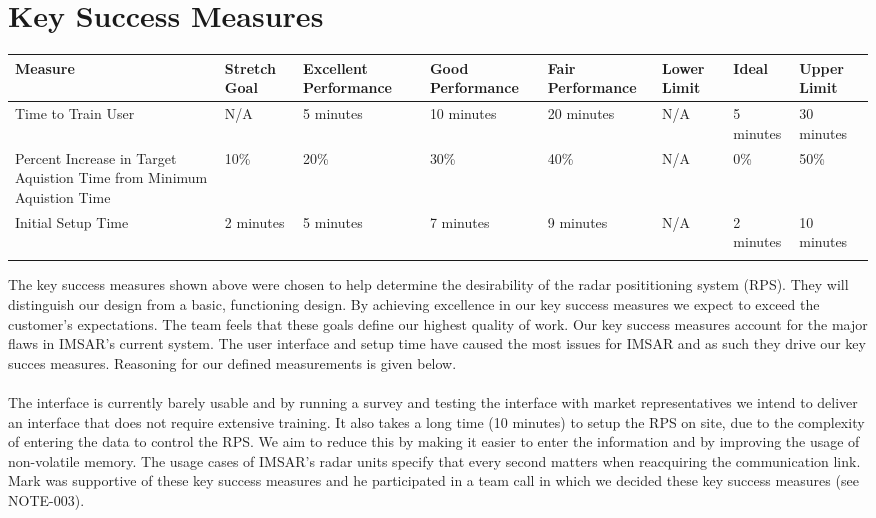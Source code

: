 
\chapter{Key Success Measures}
{
    \centering
   \resizebox{\textwidth}{!}
    {
    \begin{tabular}{>{\raggedright}p{3cm} >{\raggedright}p{2cm} >{\raggedright}p{2.3cm} >{\raggedright}p{2.3cm} >{\raggedright}p{2.2cm} >{\raggedright}p{1.2cm}  p{1.5cm} p{1.7cm}}
    
    \hline
   \textbf{Measure} & \textbf{Stretch Goal} & \textbf{Excellent Performance} & \textbf{Good Performance} & \textbf{Fair Performance} & \textbf{Lower Limit} & \textbf{Ideal} & \textbf{Upper Limit} \\
    \hline
    \hline
    
    
    
    Time to Train User &
    N/A &
    5 minutes &
    10 minutes &
    20 minutes &
    N/A &
    5 minutes &
    30 minutes \\
    
    \hline
    
    Percent Increase in Target Aquistion Time from Minimum Aquistion Time &
    10\% &
    20\% &
    30\% &
    40\% &
    N/A &
    0\% &
    50\% \\
    
    \hline
    
    Initial Setup Time &
     2 minutes &
     5 minutes &
     7 minutes &
     9 minutes &
     N/A &
     2 minutes &
     10 minutes\\
    
    \hline    
    
    \\
    
 \end{tabular}
 }
 }
 The key success measures shown above were chosen to help determine the desirability of the radar posititioning system (RPS). They will distinguish our design from a basic, functioning design. By achieving excellence in our key success measures we expect to exceed the customer's expectations. The team feels that these goals define our highest quality of work. Our key success measures account for the major flaws in IMSAR's current system. The user interface and setup time have caused the most issues for IMSAR and as such they drive our key succes measures. Reasoning for our defined measurements is given below.
 ~\\~\\
  The interface is currently barely usable and by running a survey and testing the interface with market representatives we intend to deliver an interface that does not require extensive training. It also takes a long time (10 minutes) to setup the RPS on site, due to the complexity of entering the data to control the RPS. We aim to reduce this by making it easier to enter the information and by improving the usage of non-volatile memory. The usage cases of IMSAR's radar units specify that every second matters when reacquiring the communication link. Mark was supportive of these key success measures and he participated in a team call in which we decided these key success measures (see NOTE-003).
  ~\\~\\
